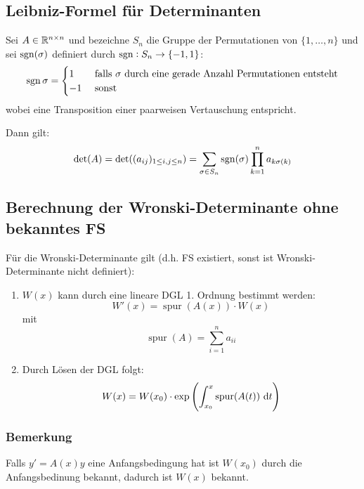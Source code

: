 \subsection{Leibniz-Formel für Determinanten}
Sei $A \in \mathbb{R}^{n \times n}$ und bezeichne $S_n$ die Gruppe der Permutationen von
$\{1, \ldots, n\}$ und sei $\operatorname{sgn}(\sigma)$ definiert durch $\operatorname{sgn}: S_n \to \{-1, 1\}$:
\begin{equation*}
	\operatorname{sgn}{\sigma} = \begin{cases}
		1 & \text{ falls $\sigma$ durch eine gerade Anzahl Permutationen entsteht} \\
		-1 & \text{ sonst}
	\end{cases}
\end{equation*}
wobei eine Transposition einer paarweisen Vertauschung entspricht.

Dann gilt:
\begin{equation*}
	\det(A) = \det((a_{ij})_{1\leq  i,j \leq n}) = 
	\sum_{\sigma \in S_n} \operatorname{sgn}(\sigma) \prod_{k=1}^n a_{k\sigma(k)}
\end{equation*}

\subsection{Berechnung der Wronski-Determinante ohne bekanntes FS}
Für die Wronski-Determinante gilt (d.h. FS existiert, sonst ist Wronski-Determinante nicht
definiert):
\begin{enumerate}[label= (\alph*)]
	\item $W(x)$ kann durch eine lineare DGL 1. Ordnung bestimmt werden:
		\begin{equation*}
			W'(x) = \operatorname{spur}(A(x)) \cdot W(x)
		\end{equation*}
		mit
		\begin{equation*}
			\operatorname{spur}(A) = \sum_{i=1}^n a_{ii}
		\end{equation*}
	\item
		Durch Lösen der DGL folgt:
		\begin{equation*}
			W(x) = W(x_0) \cdot \exp\left(\int_{x_0}^x \operatorname{spur}(A(t)) \text{ d}t \right)
		\end{equation*}
\end{enumerate}

\subsubsection{Bemerkung}
Falls $y' = A(x) y$ eine Anfangsbedingung hat ist $W(x_0)$ durch die Anfangsbedinung bekannt, dadurch ist
$W(x)$ bekannt.


